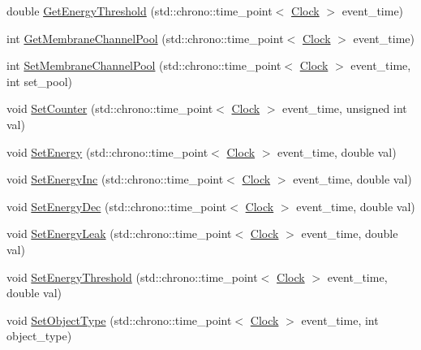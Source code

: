 \begin{DoxyCompactItemize}
\item 
double \hyperlink{class_membrane_a7ce7398888bdad73ac848a2362261acf}{Get\+Energy\+Threshold} (std\+::chrono\+::time\+\_\+point$<$ \hyperlink{universe_8h_a0ef8d951d1ca5ab3cfaf7ab4c7a6fd80}{Clock} $>$ event\+\_\+time)
\item 
int \hyperlink{class_membrane_a270278dd346edfe8c7bbd4c48929fdd5}{Get\+Membrane\+Channel\+Pool} (std\+::chrono\+::time\+\_\+point$<$ \hyperlink{universe_8h_a0ef8d951d1ca5ab3cfaf7ab4c7a6fd80}{Clock} $>$ event\+\_\+time)
\item 
int \hyperlink{class_membrane_a2cb70232c6aecf1c83a8e0918cb7fabe}{Set\+Membrane\+Channel\+Pool} (std\+::chrono\+::time\+\_\+point$<$ \hyperlink{universe_8h_a0ef8d951d1ca5ab3cfaf7ab4c7a6fd80}{Clock} $>$ event\+\_\+time, int set\+\_\+pool)
\item 
void \hyperlink{class_membrane_a4bff43b38d7046867f220392a39cc272}{Set\+Counter} (std\+::chrono\+::time\+\_\+point$<$ \hyperlink{universe_8h_a0ef8d951d1ca5ab3cfaf7ab4c7a6fd80}{Clock} $>$ event\+\_\+time, unsigned int val)
\item 
void \hyperlink{class_membrane_a37beeb28761af644bc3a51d3509f14f1}{Set\+Energy} (std\+::chrono\+::time\+\_\+point$<$ \hyperlink{universe_8h_a0ef8d951d1ca5ab3cfaf7ab4c7a6fd80}{Clock} $>$ event\+\_\+time, double val)
\item 
void \hyperlink{class_membrane_abd1c69b9b0260799afd3965c34f881ff}{Set\+Energy\+Inc} (std\+::chrono\+::time\+\_\+point$<$ \hyperlink{universe_8h_a0ef8d951d1ca5ab3cfaf7ab4c7a6fd80}{Clock} $>$ event\+\_\+time, double val)
\item 
void \hyperlink{class_membrane_acefb2fe781d7316b232614663777cde1}{Set\+Energy\+Dec} (std\+::chrono\+::time\+\_\+point$<$ \hyperlink{universe_8h_a0ef8d951d1ca5ab3cfaf7ab4c7a6fd80}{Clock} $>$ event\+\_\+time, double val)
\item 
void \hyperlink{class_membrane_a96618ef2c05a8af5d6bd8606c9b8eae8}{Set\+Energy\+Leak} (std\+::chrono\+::time\+\_\+point$<$ \hyperlink{universe_8h_a0ef8d951d1ca5ab3cfaf7ab4c7a6fd80}{Clock} $>$ event\+\_\+time, double val)
\item 
void \hyperlink{class_membrane_a6d0b96fb6d823cc113dd56b8889b1544}{Set\+Energy\+Threshold} (std\+::chrono\+::time\+\_\+point$<$ \hyperlink{universe_8h_a0ef8d951d1ca5ab3cfaf7ab4c7a6fd80}{Clock} $>$ event\+\_\+time, double val)
\item 
void \hyperlink{class_membrane_a5ba2bcb906f3984b28f1030207e106ad}{Set\+Object\+Type} (std\+::chrono\+::time\+\_\+point$<$ \hyperlink{universe_8h_a0ef8d951d1ca5ab3cfaf7ab4c7a6fd80}{Clock} $>$ event\+\_\+time, int object\+\_\+type)

\end{DoxyCompactItemize}
